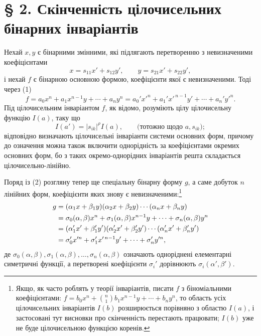 \documentclass[11pt]{article}
\begin{document}
\section*{§ 2. Скінченність цілочисельних бінарних інваріантів}

Нехай \(x,y\) є бінарними змінними, які підлягають перетворенню з невизначеними коефіцієнтами
\begin{equation}
        x=s_{11}x'+s_{12}y',\qquad y=s_{21}x'+s_{22}y',
\end{equation}
і нехай \(f\) є бінарною основною формою, коефіцієнти якої є невизначеними. Тоді через (1)
\begin{equation}
        f=a_0x^n+a_1x^{n-1}y+\cdots+a_ny^n
        =a_0'x'^n+a_1'x'^{\,n-1}y'+\cdots+a_n'y'^n.
\end{equation}
Під цілочисельним інваріантом \(f\), як відомо, розуміють цілу цілочисельну функцію \(I(a)\), таку що
\begin{equation}
        I(a')=|s_{ik}|^\rho I(a),\qquad \text{(тотожно щодо \(a,s_{ik}\))};
\end{equation}
відповідно визначають цілочисельні інваріанти системи основних форм, причому до означення можна також включити однорідність за коефіцієнтами окремих основних форм, бо з таких окремо-однорідних інваріантів решта складається цілочисельно-лінійно.

Поряд із (2) розгляну тепер ще спеціальну бінарну форму \(g\), а саме добуток \(n\) лінійних форм, коефіцієнти яких знову є невизначеними:\footnote{Якщо, як часто роблять у теорії інваріантів, писати \(f\) з біноміальними коефіцієнтами: \(f=b_0x^n+\binom n1b_1x^{n-1}y+\cdots+b_ny^n\), то область усіх цілочисельних інваріантів \(I(b)\) розширюється порівняно з областю \(I(a)\), і застосовані тут висновки про скінченність перестають працювати; \(I(b)\) уже не буде цілочисельною функцією коренів.}
\begin{align}
        g&=(\alpha_1x+\beta_1y)(\alpha_2x+\beta_2y)\cdots(\alpha_nx+\beta_ny)\notag\\
         &=\sigma_0(\alpha,\beta)x^n+\sigma_1(\alpha,\beta)x^{n-1}y+\cdots+\sigma_n(\alpha,\beta)y^n\notag\\
         &=(\alpha_1'x'+\beta_1'y')(\alpha_2'x'+\beta_2'y')\cdots(\alpha_n'x'+\beta_n'y')\notag\\
         &=\sigma_0'x'^n+\sigma_1'x'^{\,n-1}y'+\cdots+\sigma_n'y'^n,
\end{align}
де \(\sigma_0(\alpha,\beta),\sigma_1(\alpha,\beta),\ldots,\sigma_n(\alpha,\beta)\) означають одноріднені елементарні симетричні функції, а перетворені коефіцієнти \(\sigma_i'\) дорівнюють \(\sigma_i(\alpha',\beta')\).
\end{document}
